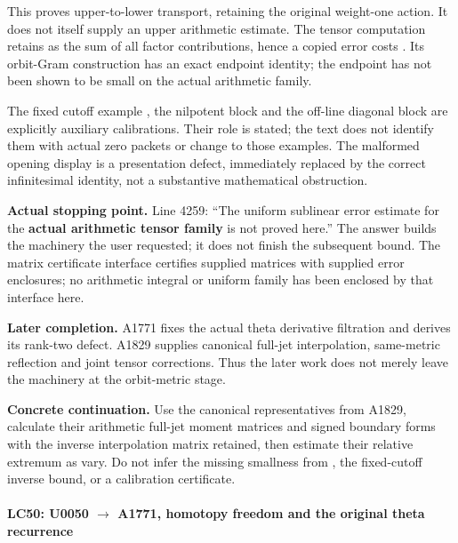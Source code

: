 This proves upper-to-lower transport, retaining the original weight-one
action. It does not itself supply an upper arithmetic estimate. The
tensor computation retains \protect{} as the sum of all
\protect{} factor contributions, hence a copied error costs
\protect{}. Its orbit-Gram construction has an exact
endpoint identity; the endpoint has not been shown to be small on the
actual arithmetic family.

The fixed cutoff example \protect{}, the nilpotent block
and the off-line diagonal block are explicitly auxiliary calibrations.
Their role is stated; the text does not identify them with actual zero
packets or change \protect{} to those examples. The malformed
opening display \protect{} is a presentation
defect, immediately replaced by the correct infinitesimal identity, not
a substantive mathematical obstruction.

\textbf{Actual stopping point.} Line 4259: ``The uniform sublinear error
estimate for the \textbf{actual arithmetic tensor family} is not proved
here.'' The answer builds the machinery the user requested; it does not
finish the subsequent bound. The matrix certificate interface certifies
supplied matrices with supplied error enclosures; no arithmetic integral
or uniform family has been enclosed by that interface here.

\textbf{Later completion.} A1771 fixes the actual theta derivative
filtration and derives its rank-two defect. A1829 supplies canonical
full-jet interpolation, same-metric reflection and joint tensor
corrections. Thus the later work does not merely leave the machinery at
the orbit-metric stage.

\textbf{Concrete continuation.} Use the canonical representatives from
A1829, calculate their arithmetic full-jet moment matrices and signed
boundary forms with the inverse interpolation matrix retained, then
estimate their relative extremum as \protect{} vary. Do not
infer the missing smallness from \protect{}, the fixed-cutoff
inverse bound, or a calibration certificate.

\paragraph{\texorpdfstring{LC50: U0050
\allowbreak{}\ensuremath{→}\allowbreak{} A1771, homotopy freedom and the
original theta
recurrence}{LC50: U0050  A1771, homotopy freedom and the original theta recurrence}}\label{lc50-u0050-a1771-homotopy-freedom-and-the-original-theta-recurrence}

